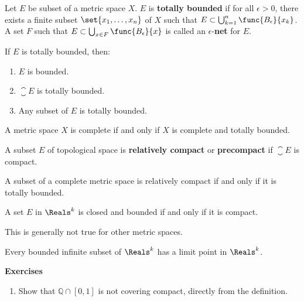 \begin{definition}
    Let \(E\) be subset of a metric space \(X\). \(E\) is \textbf{totally bounded} if for all \(\epsilon > 0\),  there exists a finite subset \(\set{x_1, \dots , x_n}\) of \(X\) such that \(E \subset \bigcup_{k= 1}^n \func{B_{\epsilon}}{x_k}\). A set \(F\) such that \(E \subset  \bigcup_{x \in F} \func{B_{\epsilon}}{x}\) is called an  \(\epsilon\)-\textbf{net} for \(E\).
\end{definition}

\begin{proposition}
    If \(E\) is totally bounded, then:
    \begin{enumerate}
        \item \(E\) is bounded.
        \item \(\closure E\) is totally bounded.
        \item Any subset of \(E\) is totally bounded.
    \end{enumerate}
\end{proposition}

\begin{theorem}
    A metric space \(X\) is complete if and only if \(X\) is complete and totally bounded.
\end{theorem}

\begin{definition}
    A subset \(E\) of topological space is \textbf{relatively compact} or \textbf{precompact} if \(\closure E\) is compact.
\end{definition}

\begin{corollary}
    A subset of a complete metric space is relatively compact if and only if it is totally bounded.
\end{corollary}

\begin{theorem}
    A set \(E\) in \(\Reals^k\) is closed and bounded  if and only if it is compact.
\end{theorem}

\begin{note}
    This is generally not true for other metric spaces.
\end{note}

\begin{theorem}[Weierstrass]
    Every bounded infinite subset of \(\Reals^k\) has a limit point in \(\Reals^k\).
\end{theorem}

{\Large\textbf{Exercises}}
\begin{enumerate}
    \item Show that \(\mathbb{Q} \cap [0,1]\) is not covering compact, directly from the definition.
\end{enumerate}


